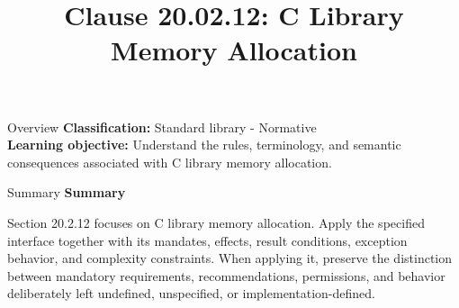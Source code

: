 \documentclass[10pt,letterpaper]{article}
\title{Clause 20.02.12: C Library Memory Allocation}
\author{}
\date{}
\begin{document}
\maketitle
\begin{CornellOverviewBox}{Overview}
\textbf{Classification:} Standard library - Normative\\[2pt]
\textbf{Learning objective:} Understand the rules, terminology, and semantic consequences associated with C library memory allocation.
\end{CornellOverviewBox}\begin{CornellSummaryBox}{Summary}
{\sffamily\bfseries\color{Accent} Summary}\par\vspace{3pt}Section 20.2.12 focuses on C library memory allocation. Apply the specified interface together with its mandates, effects, result conditions, exception behavior, and complexity constraints. When applying it, preserve the distinction between mandatory requirements, recommendations, permissions, and behavior deliberately left undefined, unspecified, or implementation-defined.
\end{CornellSummaryBox}
\end{document}
